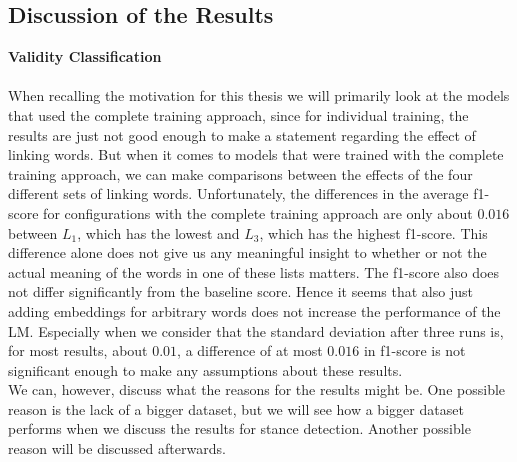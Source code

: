 \subsection{Discussion of the Results}
\textbf{Validity Classification} \\\\
When recalling the motivation for this thesis we will primarily look at the models that used the complete training approach, since for individual training, the results are just not good enough to make a statement regarding the effect of linking words. But when it comes to models that were trained with the complete training approach, we can make comparisons between the effects of the four different sets of linking words. Unfortunately, the differences in the average f1-score for configurations with the complete training approach are only about $0.016$ between $L_1$, which has the lowest and $L_3$, which has the highest f1-score. This difference alone does not give us any meaningful insight to whether or not the actual meaning of the words in one of these lists matters. The f1-score also does not differ significantly from the baseline score. Hence it seems that also just adding embeddings for arbitrary words does not increase the performance of the LM. Especially when we consider that the standard deviation after three runs is, for most results, about $0.01$, a difference of at most $0.016$ in f1-score is not significant enough to make any assumptions about these results. \\
We can, however, discuss what the reasons for the results might be. One possible reason is the lack of a bigger dataset, but we will see how a bigger dataset performs when we discuss the results for stance detection. Another possible reason will be discussed afterwards. \\

